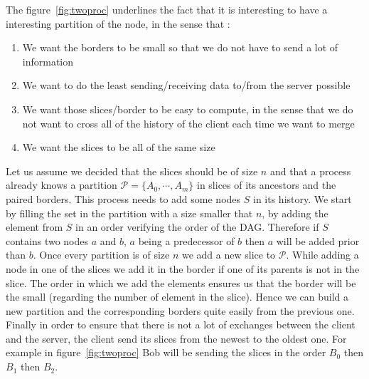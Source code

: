 The figure~\ref{fig:twoproc} underlines the fact that it is interesting to have a interesting partition of the node, in the sense that :
\begin{enumerate}
 \item We want the borders to be small so that we do not have to send a lot of information
 \item We want to do the least sending/receiving data to/from the server possible
 \item We want those slices/border to be easy to compute, in the sense that we do not want to cross all of the history of the client each time we want to merge
 \item We want the slices to be all of the same size
\end{enumerate}
Let us assume we decided that the slices should be of size $n$ and that a process already knows a partition $\mathcal{P} = \{A_0,\cdots,A_m\}$ in slices of its ancestors and the paired borders. This process needs to add some nodes $S$ in its history. We start by filling the set in the partition with a size smaller that $n$, by adding the element from $S$ in an order verifying the order of the DAG. Therefore if $S$ contains two nodes $a$ and $b$, $a$ being a predecessor of $b$ then $a$ will be added prior than $b$. Once every partition is of size $n$ we add a new slice to $\mathcal P$. While adding a node in one of the slices we add it in the border if one of its parents is not in the slice. The order in which we add the elements ensures us that the border will be the small (regarding the number of element in the slice). Hence we can build a new partition and the corresponding borders quite easily from the previous one. Finally in order to ensure that there is not a lot of exchanges between the client and the server, the client send its slices from the newest to the oldest one. For example in figure~\ref{fig:twoproc} Bob will be sending the slices in the order $B_0$ then $B_1$ then $B_2$.
